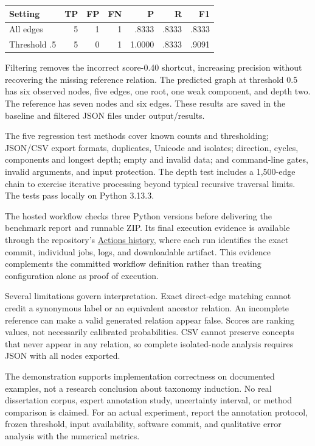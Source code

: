 \documentclass[12pt,a4paper]{article}
\newcommand{\link}[2]{\href{#1}{#2}}
\begin{document}
\noindent\begin{tabularx}{\textwidth}{|X|r|r|r|r|r|r|}\hline
\textbf{Setting} & \textbf{TP} & \textbf{FP} & \textbf{FN} & \textbf{P} & \textbf{R} & \textbf{F1} \\\hline
All edges & 5 & 1 & 1 & .8333 & .8333 & .8333 \\\hline
Threshold .5 & 5 & 0 & 1 & 1.0000 & .8333 & .9091 \\\hline
\end{tabularx}

Filtering removes the incorrect score-0.40 shortcut, increasing precision without recovering the missing reference relation. The predicted graph at threshold 0.5 has six observed nodes, five edges, one root, one weak component, and depth two. The reference has seven nodes and six edges. These results are saved in the baseline and filtered JSON files under output/results.

The five regression test methods cover known counts and thresholding; JSON/CSV export formats, duplicates, Unicode and isolates; direction, cycles, components and longest depth; empty and invalid data; and command-line gates, invalid arguments, and input protection. The depth test includes a 1,500-edge chain to exercise iterative processing beyond typical recursive traversal limits. The tests pass locally on Python 3.13.3.

The hosted workflow checks three Python versions before delivering the benchmark report and runnable ZIP. Its final execution evidence is available through the repository's \link{https://github.com/thgank/taxonomy-evaluator/actions}{Actions history}, where each run identifies the exact commit, individual jobs, logs, and downloadable artifact. This evidence complements the committed workflow definition rather than treating configuration alone as proof of execution.

Several limitations govern interpretation. Exact direct-edge matching cannot credit a synonymous label or an equivalent ancestor relation. An incomplete reference can make a valid generated relation appear false. Scores are ranking values, not necessarily calibrated probabilities. CSV cannot preserve concepts that never appear in any relation, so complete isolated-node analysis requires JSON with all nodes exported.

The demonstration supports implementation correctness on documented examples, not a research conclusion about taxonomy induction. No real dissertation corpus, expert annotation study, uncertainty interval, or method comparison is claimed. For an actual experiment, report the annotation protocol, frozen threshold, input availability, software commit, and qualitative error analysis with the numerical metrics.
\end{document}
